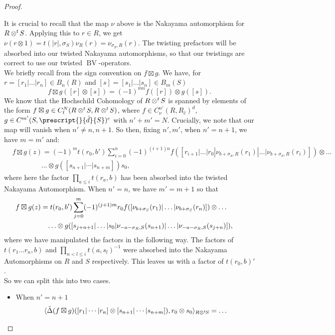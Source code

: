 \documentclass{article}
\newcommand{\ten}{\otimes}
\newcommand{\twisten}{\otimes^t\hspace{-1pt}}
\newcommand{\bv}{\operatorname{BV}}
\newcommand{\els}{[s_{n+1} | \cdots |s_{n+m}]}
\theoremstyle{plain}
\theoremstyle{definition}
\begin{document}
\begin{proof}
\begin{pfparts}
It is crucial to recall that the map $\nu$ above is the Nakayama automorphism for $R\twisten S$. Applying this to $r \in R$, we get $\nu(r \otimes 1) = t(|r|,\sigma_S)\nu_R(r)=\nu_{\sigma_S, R}(r)$. The twisting prefactors will be absorbed into our twisted Nakayama automorphisms, so that our twistings are correct to use our twisted $\bv$-operators. \\[5pt]
We briefly recall from \cite{BriggsWitherspoon} the sign convention on $f\boxtimes g$. We have, for $r=[r_1|\ldots|r_n]\in B_n(R)$ and $[s]=[s_1|\ldots|s_n] \in B_m(S)$
$$f \boxtimes g ([r] \otimes [s]) = (-1)^{mn}f([r]) \otimes g([s]).$$
We know that the Hochschild Cohomology of $R \twisten S$ is spanned by elements of the form $f \boxtimes g \in C^{N}_t (R \twisten S, R \twisten S)$, where $f \in C^{n'}_\nu(R, R_{\hat{c}})^d$, $g \in C^{m'}(S, \prescript{}{\hat{d}}{S})^c$ with $n'+m'=N$. Crucially, we note that our map will vanish when $n'\not=n,n+1$. So then, fixing $n',m'$, when $n'=n+1$, we have $m=m'$ and:
$$ \begin{aligned} &f \boxtimes g (z) = (-1)^mt(r_0, b')\sum_{i=0}^n (-1)^{(i+1)n} f([r_{i+1} | \ldots | r_0 | \nu_{b+ \sigma_S, R}(r_1) | \ldots | \nu_{b+ \sigma_S, R} (r_i)]) \otimes \ldots \\
&\hspace{50pt}\ldots \otimes g(\els) s_0 ,\end{aligned}$$
where here the factor $\prod_{a\leq i} t(r_a, b)$ has been absorbed into the twisted Nakayama Automorphism. When $n'=n$, we have $m'=m+1$ so that
$$ \begin{aligned} &\hspace{-15pt}f \boxtimes g (z) = t(r_0, b')\sum_{j=0}^m (-1)^{(j+1)m} r_0 f([\nu_{ b+\sigma_S}(r_1) | \ldots | \nu_{ b+\sigma_S}(r_n)]) \otimes \ldots \\
&\hspace{30pt}\ldots \otimes g([s_{j+n+1} | \ldots | s_0 | \nu_{-a- \sigma_R, S}(s_{n+1}) | \ldots | \nu_{-a- \sigma_R,S} (s_{j+n})]),\end{aligned} $$
where we have manipulated the factors in the following way. The factors of $t(r_1\ldots r_n, b)$ and $\prod_{n < l \leq i} t(a, s_l)^{-1}$ were absorbed into the Nakayama Automorphisms on $R$ and $S$ respectively. This leaves us with a factor of $t(r_0,b)'$.\\[5pt] 
So we can split this into two cases.
\begin{itemize} 
\item When $n'=n+1$ 
$$\begin{aligned} &\langle \tilde{\Delta}(f \boxtimes g)([r_1 | \cdots | r_n] \ten \els), r_0 \otimes s_0 \rangle_{R \twisten S}=  \ldots \\

\end{aligned}$$
\end{itemize}
\end{pfparts}
\end{proof}
\end{document}
